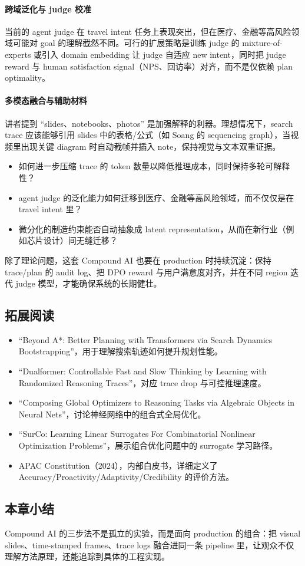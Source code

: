 \documentclass[a4paper]{article}
\begin{document}
\paragraph{跨域泛化与 judge 校准}
当前的 agent judge 在 travel intent 任务上表现突出，但在医疗、金融等高风险领域可能对 goal 的理解截然不同。可行的扩展策略是训练 judge 的 mixture-of-experts 或引入 domain embedding 让 judge 自适应 new intent，同时把 judge reward 与 human satisfaction signal（NPS、回访率）对齐，而不是仅依赖 plan optimality。

\paragraph{多模态融合与辅助材料}
讲者提到 ``slides、notebooks、photos'' 是加强解释的利器。理想情况下，search trace 应该能够引用 slides 中的表格/公式（如 Soang 的 sequencing graph），当视频里出现关键 diagram 时自动截帧并插入 note，保持视觉与文本双重证据。

\begin{itemize}
    \item 如何进一步压缩 trace 的 token 数量以降低推理成本，同时保持多轮可解释性？
    \item agent judge 的泛化能力如何迁移到医疗、金融等高风险领域，而不仅仅是在 travel intent 里？
    \item 微分化的制造约束能否自动抽象成 latent representation，从而在新行业（例如芯片设计）间无缝迁移？
\end{itemize}

除了理论问题，这套 Compound AI 也要在 production 时持续沉淀：保持 trace/plan 的 audit log、把 DPO reward 与用户满意度对齐，并在不同 region 迭代 judge 模型，才能确保系统的长期健壮。

\subsection{拓展阅读}
\begin{itemize}
    \item ``Beyond A*: Better Planning with Transformers via Search Dynamics Bootstrapping''，用于理解搜索轨迹如何提升规划性能。
    \item ``Dualformer: Controllable Fast and Slow Thinking by Learning with Randomized Reasoning Traces''，对应 trace drop 与可控推理速度。
    \item ``Composing Global Optimizers to Reasoning Tasks via Algebraic Objects in Neural Nets''，讨论神经网络中的组合式全局优化。
    \item ``SurCo: Learning Linear Surrogates For Combinatorial Nonlinear Optimization Problems''，展示组合优化问题中的 surrogate 学习路径。
    \item APAC Constitution（2024），内部白皮书，详细定义了 Accuracy/Proactivity/Adaptivity/Credibility 的评价方法。
\end{itemize}

\subsection{本章小结}
Compound AI 的三步法不是孤立的实验，而是面向 production 的组合：把 visual slides、time-stamped frames、trace logs 融合进同一条 pipeline 里，让观众不仅理解方法原理，还能追踪到具体的工程实现。
\end{document}
